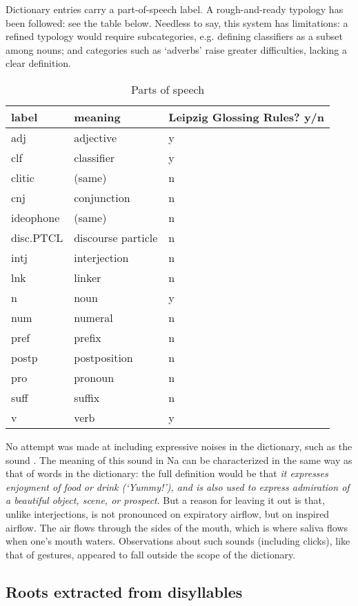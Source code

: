 Dictionary entries carry a part-of-speech label. A rough-and-ready typology has been followed: see the table below. Needless to say, this system has limitations: a refined typology would require subcategories, e.g. defining classifiers as a subset among nouns; and categories such as ‘adverbs' raise greater difficulties, lacking a clear definition.
\begin{table}
	\caption{Parts of speech}
	\centering \label{tab:glosses}
	\begin{tabular}{lll}
		\toprule
		label & meaning & Leipzig Glossing Rules? y/n \\
		\midrule
		adj & adjective & y \\
		clf & classifier & y \\
		clitic & (same) & n \\
		cnj & conjunction & n \\
		ideophone & (same) & n \\
		disc.PTCL & discourse particle & n \\
		intj & interjection & n \\
		lnk & linker & n \\
		n & noun & y \\
		num & numeral & n \\
		pref & prefix & n \\
		postp & postposition & n \\
		pro & pronoun & n \\
		suff & suffix & n \\
		v & verb & y \\
		\bottomrule
	\end{tabular}
\end{table}

No attempt was made at including expressive noises in the dictionary, such as the sound . The meaning of this sound in Na can be characterized in the same way as that of words in the dictionary: the full definition would be that  \textit{it expresses enjoyment of food or drink (‘Yummy!'), and is also used to express admiration of a beautiful object, scene, or prospect}. But a reason for leaving it out is that, unlike interjections,   is not pronounced on expiratory airflow, but on inspired airflow. The air flows through the sides of the mouth, which is where saliva flows when one's mouth waters. Observations about such sounds (including clicks), like that of gestures, appeared to fall outside the scope of the dictionary.

	\subsection{Roots extracted from disyllables} \label{sec:roots}

